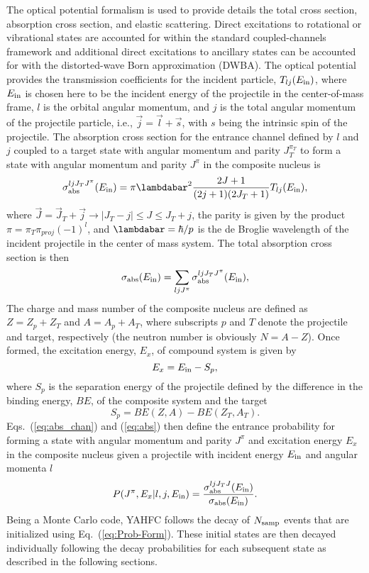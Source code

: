 \documentclass[
10pt,
showpacs,preprintnumbers,footinbib,
amsfonts,amsmath,amssymb,
aps,
prc,twocolumn,groupedaddress,superscriptaddress,
showkeys,
nofootinbib
]{revtex4-1}
\begin{document}
The optical potential formalism is used to provide details the total cross section, absorption cross section, and elastic scattering. Direct excitations to rotational or vibrational states are accounted for within the standard coupled-channels framework and additional direct excitations to ancillary states can be accounted for with the distorted-wave Born approximation (DWBA). The optical potential provides the transmission coefficients for the incident particle, $T_{lj}(E_{\rm in})$, where $E_{\rm in}$ is chosen here to be the incident energy of the projectile in the center-of-mass frame, $l$ is the orbital angular momentum, and $j$ is the total angular momentum of the projectile particle, i.e., $\vec j = \vec l + \vec s$, with $s$ being the intrinsic spin of the projectile. The absorption cross section for the entrance channel defined by $l$ and $j$ coupled to a target state with angular momentum and parity $J_T^{\pi_T}$ to form a state with angular momentum and parity $J^\pi$ in the composite nucleus is
\begin{equation}
\sigma_{\rm abs}^{ljJ_TJ^\pi}(E_{\rm in}) = {\pi}{\lambdabar^2} \frac{2J + 1}{(2j+1)(2J_T+1)}T_{lj}(E_{\rm in}),
\label{eq:abs_chan}
\end{equation}
where $\vec{J} = \vec{J}_T + \vec j \rightarrow |J_T-j| \le J \le J_T + j$, the parity is given by the product $\pi = \pi_T\pi_{proj}(-1)^l$, and $\lambdabar=\hbar/p$ is the de Broglie wavelength of the incident projectile in the center of mass system. The total absorption cross section is then
\begin{equation} 
\sigma_{\rm abs} (E_{\rm in})= \sum_{ljJ^\pi} \sigma_{\rm abs}^{ljJ_TJ^\pi}(E_{\rm in}),
\label{eq:abs}
\end{equation}
The charge and mass number of the composite nucleus are defined as $Z=Z_p+Z_T$ and $A=A_p+A_T$, where subscripts $p$ and $T$ denote the projectile and target, respectively (the neutron number is obviously $N = A - Z$). Once formed, the excitation energy, $E_x$, of compound system is given by
\begin{equation}
E_x = E_{\rm in} - S_p,
\end{equation}
where $S_p$ is the separation energy of the projectile defined by the difference in the binding energy, $BE$, of the composite system and the target
\begin{equation}
S_p = BE(Z,A) - BE(Z_T,A_T).
\end{equation}
Eqs.~(\ref{eq:abs_chan}) and (\ref{eq:abs}) then define the entrance probability for forming a state with angular momentum and parity $J^\pi$ and excitation energy $E_x$ in the composite nucleus given a projectile with incident energy $E_{\rm in}$ and angular momenta $l$
\begin{equation}
P(J^\pi,E_x|l,j,E_{\rm in}) = \frac{\sigma_{\rm abs}^{ljJ_TJ}(E_{\rm in})}{\sigma_{\rm abs} (E_{\rm in})}.
\label{eq:Prob-Form}
\end{equation}
Being a Monte Carlo code, YAHFC follows the decay of $N_{\rm samp}$ events that are initialized using Eq.~(\ref{eq:Prob-Form}). These initial states are then decayed individually following the decay probabilities for each subsequent state as described in the following sections.
\end{document}
